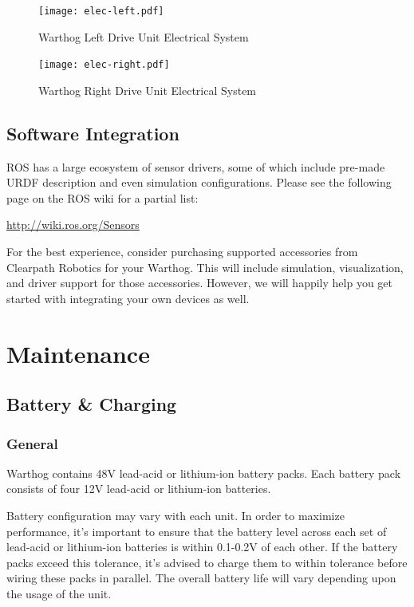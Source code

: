 \documentclass[]{clearpath-latex/clearpath-manual}
\begin{document}
\begin{figure}[!htb]
  \centering
  \texttt{[image: elec-left.pdf]}
  \caption{Warthog Left Drive Unit Electrical System}
  \label{elec-left}
\end{figure}

\begin{figure}[!htb]
  \centering
  \texttt{[image: elec-right.pdf]}
  \caption{Warthog Right Drive Unit Electrical System}
  \label{elec-right}
\end{figure}




\subsection{Software Integration}

ROS has a large ecosystem of sensor drivers, some of which include pre-made URDF description and even simulation configurations.  Please see the following page on the ROS wiki for a partial list:

\url{http://wiki.ros.org/Sensors}

For the best experience, consider purchasing supported accessories from Clearpath Robotics for your Warthog. This will include simulation, visualization, and driver support for those accessories.  However, we will happily help you get started with integrating your own devices as well.

\section{Maintenance}

\subsection{Battery \& Charging}

\subsubsection{General}

Warthog contains 48V lead-acid or lithium-ion battery packs. Each battery pack consists of four 12V lead-acid or lithium-ion batteries.

Battery configuration may vary with each unit. In order to maximize performance, it's important to ensure that the battery level across each set of lead-acid or lithium-ion batteries is within 0.1-0.2V of each other. If the battery packs exceed this tolerance, it's advised to charge them to within tolerance before wiring these packs
in parallel. The overall battery life will vary depending upon the usage of the unit.
\end{document}
